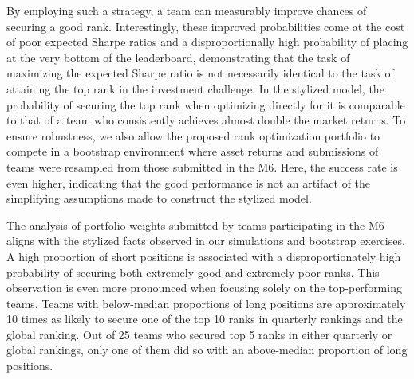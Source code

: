 \documentclass[3p,times,twocolumn]{elsarticle}
\begin{document}
By employing such a strategy, a team can measurably improve chances of securing a good rank.
Interestingly, these improved probabilities come at the cost of poor expected Sharpe ratios and a disproportionally high probability of placing at the very bottom of the leaderboard, demonstrating that the task of maximizing the expected Sharpe ratio is not necessarily identical to the task of attaining the top rank in the investment challenge.
In the stylized model, the probability of securing the top rank when optimizing directly for it is comparable to that of a team who consistently achieves almost double the market returns. 
To ensure robustness, we also allow the proposed rank optimization portfolio to compete in a bootstrap environment where asset returns and submissions of teams were resampled from those submitted in the M6. 
Here, the success rate is even higher, indicating that the good performance is not an artifact of the simplifying assumptions made to construct the stylized model.

The analysis of portfolio weights submitted by teams participating in the M6 aligns with the stylized facts observed in our simulations and bootstrap exercises. 
A high proportion of short positions is associated with a disproportionately high probability of securing both extremely good and extremely poor ranks. 
This observation is even more pronounced when focusing solely on the top-performing teams.
Teams with below-median proportions of long positions are approximately 10 times as likely to secure one of the top 10 ranks in quarterly rankings and the global ranking. 
Out of 25 teams who secured top 5 ranks in either quarterly or global rankings, only one of them did so with an above-median proportion of long positions.
\end{document}
